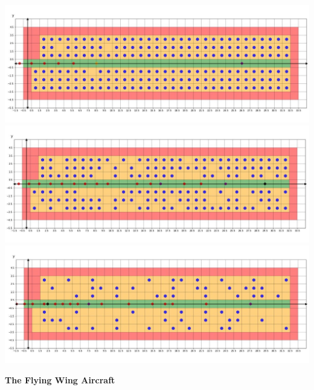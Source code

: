 \documentclass{article}
\theoremstyle{definition}
\theoremstyle{remark}
\numberwithin{equation}{section}
\begin{document}
	\begin{center}
		\clearpage
		\thispagestyle{empty}
		\includegraphics[width=14cm]{random1.jpg}\\
		\includegraphics[width=14cm]{random2.jpg}\\
		\includegraphics[width=14cm]{random3.jpg}\\
	\end{center}
	\large \textbf{The Flying Wing Aircraft}
\end{document}
